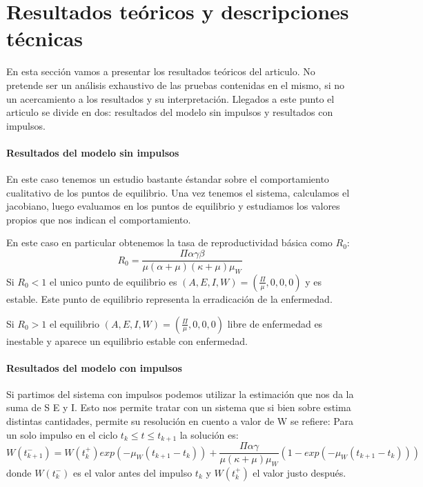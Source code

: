 \documentclass[1p]{elsarticle}
\begin{document}
\section{Resultados teóricos y descripciones técnicas}
En esta sección vamos a presentar los resultados teóricos del articulo. No pretende ser un análisis exhaustivo de las pruebas contenidas en el mismo, si no un acercamiento a los resultados y su interpretación. Llegados a este punto el articulo se divide en dos: resultados del modelo sin impulsos y resultados con impulsos.

\paragraph{Resultados del modelo sin impulsos}
En este caso tenemos un estudio bastante éstandar sobre el comportamiento cualitativo de los puntos de equilibrio. Una vez tenemos el sistema, calculamos el jacobiano, luego evaluamos en los puntos de equilibrio y estudiamos los valores propios que nos indican el comportamiento. 

En este caso en particular obtenemos la tasa de reproductividad básica como $R_0$:
$$R_0= \frac{\Pi \alpha\gamma\beta}{\mu(\alpha+\mu)(\kappa+\mu)\mu_W}$$
Si $R_0<1$ el unico punto de equilibrio es $(A,E,I,W)=(\frac{\Pi}{\mu},0,0,0)$ y es estable. Este punto de equilibrio representa la erradicación de la enfermedad.

Si $R_0>1$ el equilibrio $(A,E,I,W)=(\frac{\Pi}{\mu},0,0,0)$ libre de enfermedad es inestable y aparece un equilibrio estable con enfermedad.

\paragraph{Resultados del modelo con impulsos}
Si partimos del sistema con impulsos podemos utilizar la estimación que nos da la suma de S E y I. Esto nos permite tratar con un sistema que si bien sobre estima distintas cantidades, permite su resolución en cuento a valor de W se refiere:
Para un solo impulso en el ciclo $t_k\leq t\leq t_{k+1}$ la solución es: 
$$W(t^-_{k+1})=W(t_k^+)exp(-\mu_W(t_{k+1}-t_k))+\frac{\Pi \alpha\gamma}{\mu(\kappa+\mu)\mu_W}(1-exp(-\mu_W(t_{k+1}-t_k)))$$
donde $W(t_k^-)$ es el valor antes del impulso $t_k$ y $W(t_k^+)$ el valor justo después.
\end{document}
